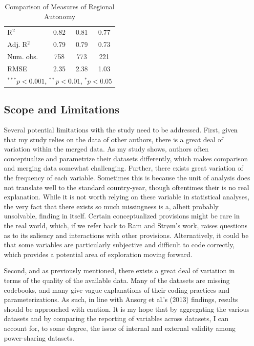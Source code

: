 \documentclass[12pt]{article}
\begin{document}
\begin{table}[!htbp]
\begin{center}
\begin{tabular}{l c c c }
			R$^2$                                & 0.82          & 0.81     & 0.77     \\
			Adj. R$^2$                           & 0.79          & 0.79     & 0.73     \\
			Num. obs.                            & 758           & 773      & 221      \\
			RMSE                                 & 2.35          & 2.38     & 1.03     \\
			\hline
			\multicolumn{4}{l}{\scriptsize{$^{***}p<0.001$, $^{**}p<0.01$, $^*p<0.05$}}
		\end{tabular}
		\caption{Comparison of Measures of Regional Autonomy}
		\label{table:coefficients}
	\end{center}
\end{table}

 
\subsection{Scope and Limitations}
Several potential limitations with the study need to be addressed. First, given that my study relies on the data of other authors, there is a great deal of variation within the merged data. As my study shows, authors often conceptualize and parametrize their datasets differently, which makes comparison and merging data somewhat challenging. Further, there exists great variation of the frequency of each variable. Sometimes this is because the unit of analysis does not translate well to the standard country-year, though oftentimes their is no real explanation. While it is not worth relying on these variable in statistical analyses, the very fact that there exists so much missingness is a, albeit probably unsolvable, finding in itself. Certain conceptualized provisions might be rare in the real world, which, if we refer back to Ram and Strøm’s work, raises questions as to its saliency and interactions with other provisions. Alternatively, it could be that some variables are particularly subjective and difficult to code correctly, which provides a potential area of exploration moving forward. 

Second, and as previously mentioned, there exists a great deal of variation in terms of the quality of the available data. Many of the datasets are missing codebooks, and many give vague explanations of their coding practices and parameterizations. As such, in line with Ansorg et al.’s (2013) findings, results should be approached with caution. It is my hope that by aggregating the various datasets and by comparing the reporting of variables across datasets, I can account for, to some degree, the issue of internal and external validity among power-sharing datasets.
\end{document}
